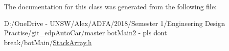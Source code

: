 The documentation for this class was generated from the following file\+:\begin{DoxyCompactItemize}
\item 
D\+:/\+One\+Drive -\/ U\+N\+S\+W/\+Alex/\+A\+D\+F\+A/2018/\+Semester 1/\+Engineering Design Practise/git\+\_\+edp\+Auto\+Car/master bot\+Main2 -\/ pls dont break/bot\+Main/\mbox{\hyperlink{_stack_array_8h}{Stack\+Array.\+h}}\end{DoxyCompactItemize}
